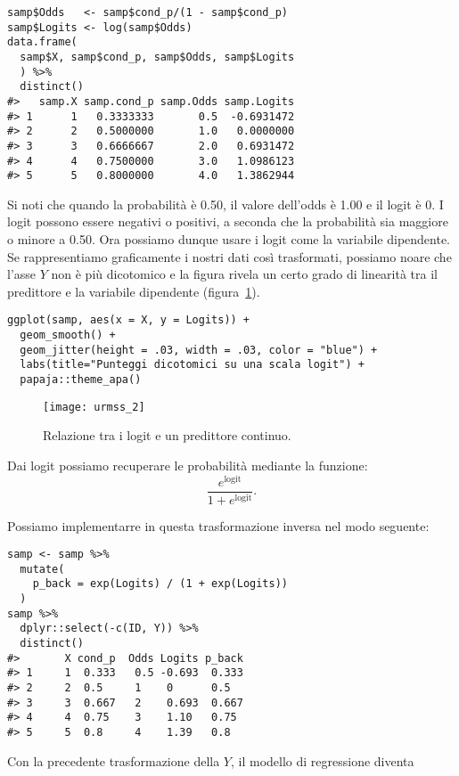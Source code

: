 \begin{lstlisting}
samp$Odds   <- samp$cond_p/(1 - samp$cond_p)
samp$Logits <- log(samp$Odds)
data.frame(
  samp$X, samp$cond_p, samp$Odds, samp$Logits
  ) %>% 
  distinct()
#>   samp.X samp.cond_p samp.Odds samp.Logits
#> 1      1   0.3333333       0.5  -0.6931472
#> 2      2   0.5000000       1.0   0.0000000
#> 3      3   0.6666667       2.0   0.6931472
#> 4      4   0.7500000       3.0   1.0986123
#> 5      5   0.8000000       4.0   1.3862944
\end{lstlisting} 
Si noti che quando la probabilità è 0.50, il valore dell'odds è 1.00 e il logit è 0. 
I logit possono essere negativi o positivi, a seconda che la probabilità sia maggiore o minore a 0.50. 
Ora possiamo dunque usare i logit come la variabile dipendente. 
Se rappresentiamo graficamente i nostri dati così trasformati, possiamo noare che l'asse $Y$ non è più dicotomico e la figura rivela un certo grado di linearità tra il predittore e la variabile dipendente (figura~\ref{fig:nonpar_dic2}).

\begin{lstlisting}
ggplot(samp, aes(x = X, y = Logits)) + 
  geom_smooth() +   
  geom_jitter(height = .03, width = .03, color = "blue") + 
  labs(title="Punteggi dicotomici su una scala logit") +
  papaja::theme_apa()
\end{lstlisting} 

\begin{figure}[h!]
  \begin{center}
    \texttt{[image: urmss\_2]}
    \caption{Relazione tra i logit e un predittore continuo.}
    \label{fig:nonpar_dic2}
  \end{center}
\end{figure}

Dai logit possiamo recuperare le probabilità mediante la funzione:
$$
\frac{e^\text{logit}}{1 + e^\text{logit}}.
$$

Possiamo implementarre in \R\; questa trasformazione inversa nel modo seguente:
\begin{lstlisting}
samp <- samp %>% 
  mutate(
    p_back = exp(Logits) / (1 + exp(Logits))
  )
samp %>% 
  dplyr::select(-c(ID, Y)) %>% 
  distinct()
#>       X cond_p  Odds Logits p_back
#> 1     1  0.333   0.5 -0.693  0.333
#> 2     2  0.5     1    0      0.5  
#> 3     3  0.667   2    0.693  0.667
#> 4     4  0.75    3    1.10   0.75 
#> 5     5  0.8     4    1.39   0.8  
\end{lstlisting} 
Con la precedente trasformazione della $Y$, il modello di regressione diventa

